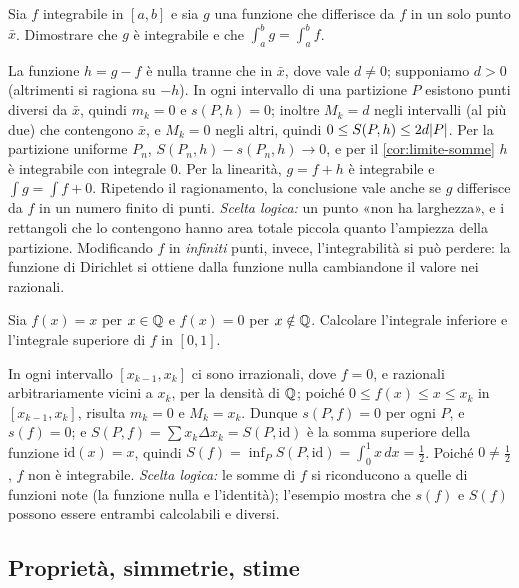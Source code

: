 \begin{esercizio}\label{es:valore-in-un-punto}
Sia $f$ integrabile in $[a,b]$ e sia $g$ una funzione che differisce da $f$ in un solo
punto $\bar x$. Dimostrare che $g$ è integrabile e che $\int_{a}^{b}g=\int_{a}^{b}f$.
\begin{soluzione}
La funzione $h=g-f$ è nulla tranne che in $\bar x$, dove vale $d\neq0$; supponiamo
$d>0$ (altrimenti si ragiona su $-h$). In ogni intervallo di una partizione $P$ esistono
punti diversi da $\bar x$, quindi $m_{k}=0$ e $s(P,h)=0$; inoltre $M_{k}=d$ negli intervalli
(al più due) che contengono $\bar x$, e $M_{k}=0$ negli altri, quindi
$0\le S(P,h)\le2d\lvert P\rvert$. Per la partizione uniforme $P_{n}$, $S(P_{n},h)-s(P_{n},h)\to0$, e
per il \cref{cor:limite-somme} $h$ è integrabile con integrale $0$. Per la linearità,
$g=f+h$ è integrabile e $\int g=\int f+0$. Ripetendo il ragionamento, la conclusione vale
anche se $g$ differisce da $f$ in un numero finito di punti. \emph{Scelta logica:} un
punto «non ha larghezza», e i rettangoli che lo contengono hanno area totale piccola
quanto l'ampiezza della partizione. Modificando $f$ in \emph{infiniti} punti, invece,
l'integrabilità si può perdere: la funzione di Dirichlet si ottiene dalla funzione
nulla cambiandone il valore nei razionali.
\end{soluzione}
\end{esercizio}

\begin{esercizio}
Sia $f(x)=x$ per $x\in\mathbb{Q}$ e $f(x)=0$ per $x\notin\mathbb{Q}$. Calcolare l'integrale inferiore e
l'integrale superiore di $f$ in $[0,1]$.
\begin{soluzione}
In ogni intervallo $[x_{k-1},x_{k}]$ ci sono irrazionali, dove $f=0$, e razionali
arbitrariamente vicini a $x_{k}$, per la densità di $\mathbb{Q}$; poiché
$0\le f(x)\le x\le x_{k}$ in $[x_{k-1},x_{k}]$, risulta $m_{k}=0$ e $M_{k}=x_{k}$. Dunque $s(P,f)=0$ per ogni $P$, e $s(f)=0$; e
$S(P,f)=\sum x_{k}\Delta x_{k}=S(P,\mathrm{id})$ è la somma superiore della funzione
$\mathrm{id}(x)=x$, quindi $S(f)=\inf_{P}S(P,\mathrm{id})=\int_{0}^{1}x\,dx=\frac12$. Poiché
$0\neq\frac12$, $f$ non è integrabile. \emph{Scelta logica:} le somme di $f$ si
riconducono a quelle di funzioni note (la funzione nulla e l'identità); l'esempio
mostra che $s(f)$ e $S(f)$ possono essere entrambi calcolabili e diversi.
\end{soluzione}
\end{esercizio}

\subsection*{Proprietà, simmetrie, stime}


